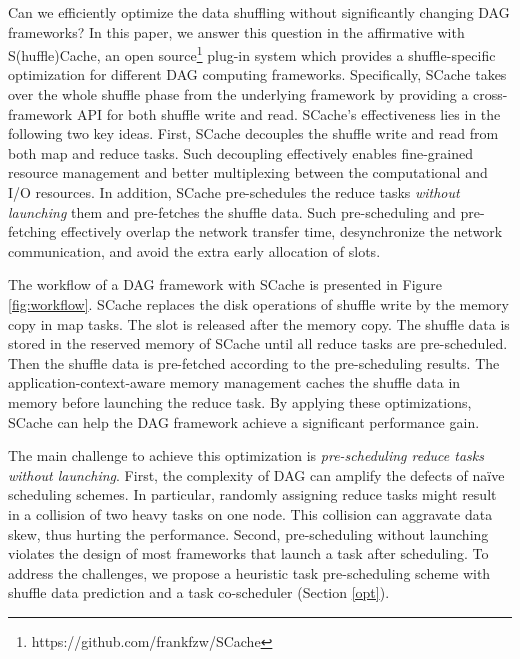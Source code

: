 Can we efficiently optimize the data shuffling without significantly changing DAG frameworks?
In this paper, we answer this question in the affirmative with S(huffle)Cache, an open source\footnote{https://github.com/frankfzw/SCache} plug-in system which provides a shuffle-specific optimization for different DAG computing frameworks.
Specifically, SCache takes over the whole shuffle phase from the underlying framework by providing a cross-framework API for both shuffle write and read.
SCache's effectiveness lies in the following two key ideas.
First, SCache decouples the shuffle write and read from both map and reduce tasks.
Such decoupling effectively enables fine-grained resource management and better multiplexing between the computational and I/O resources.
In addition, SCache pre-schedules the reduce tasks \emph{without launching} them and pre-fetches the shuffle data. 
Such pre-scheduling and pre-fetching effectively overlap the network transfer time, desynchronize the network communication, 
and avoid the extra early allocation of slots.

The workflow of a DAG framework with SCache is presented in Figure \ref{fig:workflow}. 
SCache replaces the disk operations of shuffle write by the memory copy in map tasks. 
The slot is released after the memory copy. 
The shuffle data is stored in the reserved memory of SCache until all reduce tasks are pre-scheduled. 
Then the shuffle data is pre-fetched according to the pre-scheduling results.  
The application-context-aware memory management caches the shuffle data in memory before launching the reduce task.
By applying these optimizations, SCache can help the DAG framework achieve a significant performance gain.  

The main challenge to achieve this optimization is \textit{pre-scheduling reduce tasks without launching}. 
First, the complexity of DAG can amplify the defects of na\"{i}ve scheduling schemes. 
In particular, randomly assigning reduce tasks might result in a collision of two heavy tasks on one node. 
This collision can aggravate data skew, thus hurting the performance. 
Second, pre-scheduling without launching violates the design of most frameworks that launch a task after scheduling.
To address the challenges, we propose a heuristic task pre-scheduling scheme with shuffle data prediction and a task co-scheduler (Section \ref{opt}).

